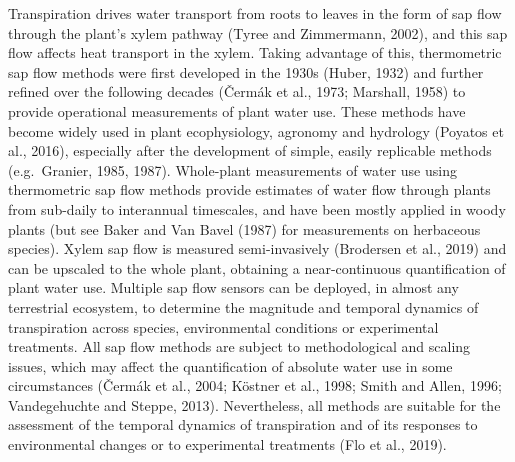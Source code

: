 \documentclass[11pt,twoside]{reedthesis}
\begin{document}
Transpiration drives water transport from roots to leaves in the form of
sap flow through the plant's xylem pathway (Tyree and Zimmermann, 2002),
and this sap flow affects heat transport in the xylem. Taking advantage
of this, thermometric sap flow methods were first developed in the 1930s
(Huber, 1932) and further refined over the following decades (Čermák et
al., 1973; Marshall, 1958) to provide operational measurements of plant
water use. These methods have become widely used in plant ecophysiology,
agronomy and hydrology (Poyatos et al., 2016), especially after the
development of simple, easily replicable methods (e.g.~Granier, 1985,
1987). Whole-plant measurements of water use using thermometric sap flow
methods provide estimates of water flow through plants from sub-daily to
interannual timescales, and have been mostly applied in woody plants
(but see Baker and Van Bavel (1987) for measurements on herbaceous
species). Xylem sap flow is measured semi-invasively (Brodersen et al.,
2019) and can be upscaled to the whole plant, obtaining a
near-continuous quantification of plant water use. Multiple sap flow
sensors can be deployed, in almost any terrestrial ecosystem, to
determine the magnitude and temporal dynamics of transpiration across
species, environmental conditions or experimental treatments. All sap
flow methods are subject to methodological and scaling issues, which may
affect the quantification of absolute water use in some circumstances
(Čermák et al., 2004; Köstner et al., 1998; Smith and Allen, 1996;
Vandegehuchte and Steppe, 2013). Nevertheless, all methods are suitable
for the assessment of the temporal dynamics of transpiration and of its
responses to environmental changes or to experimental treatments (Flo et
al., 2019).\par
\end{document}
